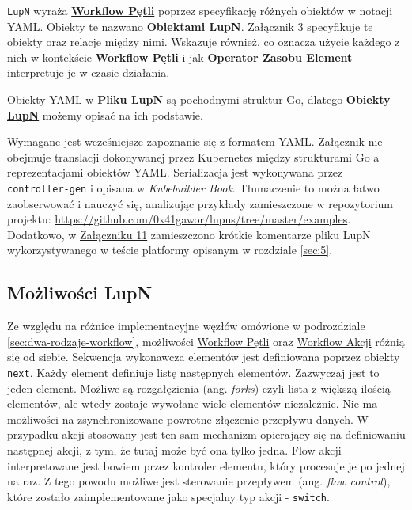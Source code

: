 \texttt{LupN} wyraża \hyperlink{def:workflow-petli}{\textbf{Workflow Pętli}} poprzez specyfikację różnych obiektów w notacji YAML. Obiekty te nazwano \hyperlink{def:obiekt-lupn}{\textbf{Obiektami LupN}}. \hyperref[appendix:3]{Załącznik 3} specyfikuje te obiekty oraz relacje między nimi. Wskazuje również, co oznacza użycie każdego z nich w kontekście \hyperlink{def:workflow-petli}{\textbf{Workflow Pętli}} i jak \hyperlink{def:operator-zasobu-element}{\textbf{Operator Zasobu Element}} interpretuje je w czasie działania.

Obiekty YAML w \hyperlink{def:plik-lupn}{\textbf{Pliku LupN}} są pochodnymi struktur Go, dlatego \hyperlink{def:obiekt-lupn}{\textbf{Obiekty LupN}} możemy opisać na ich podstawie. 

Wymagane jest wcześniejsze zapoznanie się z formatem YAML. Załącznik nie obejmuje translacji dokonywanej przez Kubernetes między strukturami Go a reprezentacjami obiektów YAML. Serializacja jest wykonywana przez \texttt{controller-gen} i opisana w \textit{Kubebuilder Book}. Tłumaczenie to można łatwo zaobserwować i nauczyć się, analizując przykłady zamieszczone w repozytorium projektu: \url{https://github.com/0x41gawor/lupus/tree/master/examples}. Dodatkowo, w \hyperlink{appendix:11}{Załączniku 11} zamieszczono krótkie komentarze pliku LupN wykorzystywanego w teście platformy opisanym w rozdziale \ref{sec:5}.

\subsection{Możliwości LupN}

Ze względu na różnice implementacyjne węzłów omówione w podrozdziale \ref{sec:dwa-rodzaje-workflow}, możliwości \hyperlink{def:workflow-petli}{Workflow Pętli} oraz \hyperlink{def:workflow-akcji}{Workflow Akcji} różnią się od siebie. Sekwencja wykonawcza elementów jest definiowana poprzez obiekty \texttt{next}. Każdy element definiuje listę następnych elementów. Zazwyczaj jest to jeden element. Możliwe są rozgałęzienia (ang. \textit{forks}) czyli lista z większą ilością elementów, ale wtedy zostaje wywołane wiele elementów niezależnie. Nie ma możliwości na zsynchronizowane powrotne złączenie przepływu danych. W przypadku akcji stosowany jest ten sam mechanizm opierający się na definiowaniu następnej akcji, z tym, że tutaj może być ona tylko jedna. Flow akcji interpretowane jest bowiem przez kontroler elementu, który procesuje je po jednej na raz. Z tego powodu możliwe jest sterowanie przepływem (ang. \textit{flow control}), które zostało zaimplementowane jako specjalny typ akcji - \texttt{switch}. 

